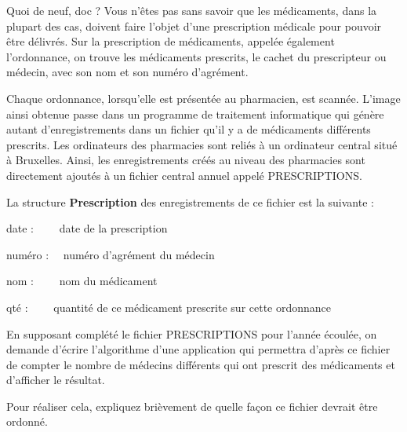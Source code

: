 \begin{Exercice}{Quoi de neuf, doc ?}
	Vous n’êtes pas sans savoir que les médicaments, dans la plupart des
	cas, doivent faire l’objet d’une prescription médicale pour pouvoir
	être délivrés. Sur la prescription de médicaments, appelée également
	l’ordonnance, on trouve les médicaments prescrits, le cachet du
	prescripteur ou médecin, avec son nom et son numéro d’agrément.

	Chaque ordonnance, lorsqu’elle est présentée au pharmacien, est scannée.
	L’image ainsi obtenue passe dans un programme de traitement
	informatique qui génère autant d’enregistrements dans un fichier qu’il
	y a de médicaments différents prescrits. Les ordinateurs des pharmacies
	sont reliés à un ordinateur central situé à Bruxelles. Ainsi, les
	enregistrements créés au niveau des pharmacies sont directement ajoutés
	à un fichier central annuel appelé PRESCRIPTIONS. 

	La structure \textbf{Prescription} des enregistrements de ce fichier est
	la suivante :

	{	date : \ \ \ \ date de la prescription}

	{	numéro : \ \ numéro d’agrément du médecin}

	{	nom : \ \ \ \ nom du médicament}

	{	qté : \ \ \ \ quantité de ce médicament prescrite sur cette ordonnance}

	En supposant complété le fichier PRESCRIPTIONS pour l’année écoulée, on
	demande d’écrire l’algorithme d’une application qui permettra d’après
	ce fichier de compter le nombre de médecins différents qui ont prescrit
	des médicaments et d’afficher le résultat.

	Pour réaliser cela, expliquez brièvement de quelle façon ce fichier
	devrait être ordonné.
\end{Exercice}

